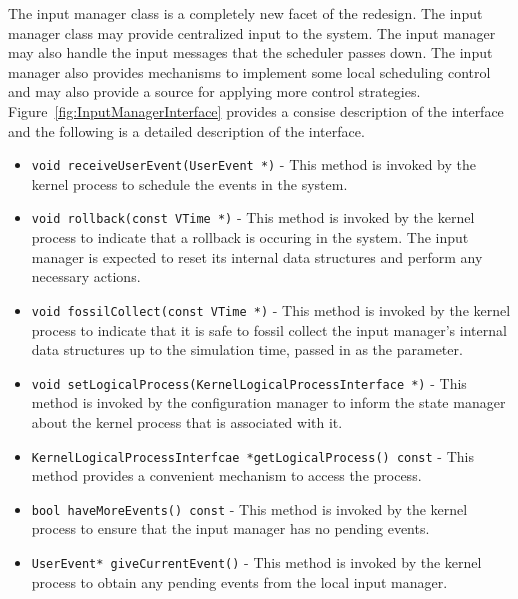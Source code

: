 The input manager class is a completely new facet of the redesign. The
input manager class may provide centralized input to the system. The input
manager may also handle the input messages that the scheduler passes down.
The input manager also provides mechanisms to implement some local
scheduling control and may also provide a source for applying more control
strategies.  Figure~\ref{fig:InputManagerInterface} provides a consise
description of the interface and the following is a detailed description
of the interface.

\begin{itemize}

\item {\tt void receiveUserEvent(UserEvent *)} - This method is invoked by
  the kernel process to schedule the events in the system.

\item {\tt void rollback(const VTime *)} - This method is invoked by the
  kernel process to indicate that a rollback is occuring in the
  system. The input manager is expected to reset its internal data
  structures and perform any necessary actions.
  
\item {\tt void fossilCollect(const VTime *)} - This method is invoked by
  the kernel process to indicate that it is safe to fossil collect the
  input manager's internal data structures up to the simulation time,
  passed in as the parameter.

\item {\tt void setLogicalProcess(KernelLogicalProcessInterface *)} - This
  method is invoked by the configuration manager to inform the state
  manager about the kernel process that is associated with it.

\item {\tt KernelLogicalProcessInterfcae *getLogicalProcess() const} -
  This method provides a convenient mechanism to access the process.
  
\item {\tt bool haveMoreEvents() const} - This method is invoked by the
  kernel process to ensure that the input manager has no pending events. 

\item {\tt UserEvent* giveCurrentEvent()} - This method is invoked by the
  kernel process to obtain any pending events from the local input
  manager.

\end{itemize}

